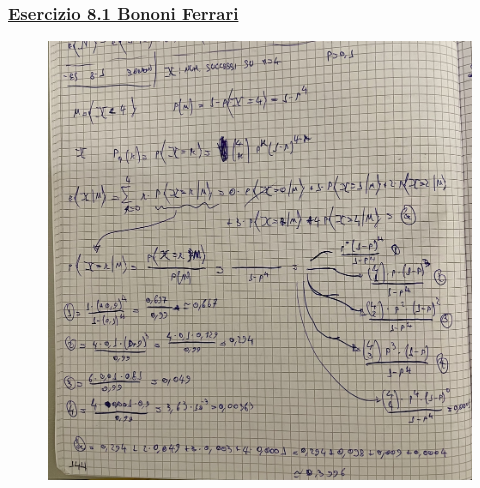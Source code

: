\documentclass{article}
\begin{document}
\subsubsection{\underline{Esercizio 8.1 Bononi Ferrari}}
\begin{figure}[ht]
\centering
\includegraphics[scale=0.10]{ese/40.jpeg}
\end{figure}
\end{document}
